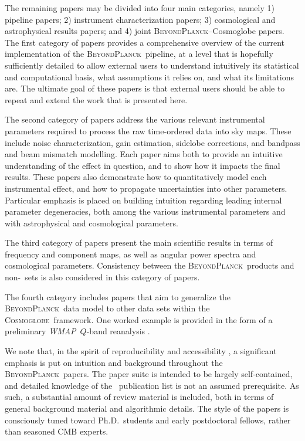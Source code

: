 \documentclass[onecolumn]{aa}
\def\WMAP{\emph{WMAP}}
\newcommand{\BP}{\textsc{BeyondPlanck}}
\newcommand{\cosmoglobe}{\textsc{Cosmoglobe}}
\begin{document}
The remaining papers may be divided into four main categories, namely
1) pipeline papers; 2) instrument characterization papers; 3)
cosmological and astrophysical results papers; and 4) joint
\BP--Cosmoglobe papers.  The first category of papers provides a
comprehensive overview of the current implementation of the
\BP\ pipeline, at a level that is hopefully sufficiently detailed to
allow external users to understand intuitively its statistical and
computational basis, what assumptions it relies on, and what its
limitations are.  The ultimate goal of these papers is that external
users should be able to repeat and extend the work that is presented
here.

The second category of papers address the various relevant
instrumental parameters required to process the raw time-ordered data
into sky maps. These include noise characterization, gain estimation,
sidelobe corrections, and bandpass and beam mismatch modelling. Each
paper aims both to provide an intuitive understanding of the effect in
question, and to show how it impacts the final results.  These papers
also demonstrate how to quantitatively model each instrumental effect,
and how to propagate uncertainties into other parameters. Particular
emphasis is placed on building intuition regarding leading internal
parameter degeneracies, both among the various instrumental parameters
and with astrophysical and cosmological parameters.

The third category of papers present the main scientific results in
terms of frequency and component maps, as well as angular power
spectra and cosmological parameters. Consistency between the
\BP\ products and non-\Planck\ sets is also considered in this
category of papers.

The fourth category includes papers that aim to generalize the
\BP\ data model to other data sets within the
\cosmoglobe\ framework. One worked example is provided in the form of
a preliminary \WMAP\ $Q$-band reanalysis \citep{bp17}.

We note that, in the spirit of reproducibility and accessibility
\citep{bp05}, a significant emphasis is put on intuition and
background throughout the \BP\ papers. The paper suite is intended to
be largely self-contained, and detailed knowledge of the
\Planck\ publication list is not an assumed prerequisite. As such, a
substantial amount of review material is included, both in terms of
general background material and algorithmic details. The style of the
papers is consciously tuned toward Ph.D.\ students and early
postdoctoral fellows, rather than seasoned CMB experts.
\end{document}

